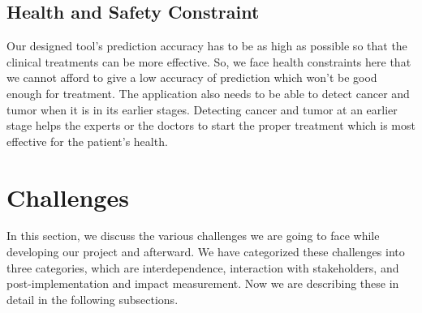 \subsection{Health and Safety Constraint}
Our designed tool’s prediction accuracy has to be as high as possible so that the clinical treatments can be more effective. So, we face health constraints here that we cannot afford to give a low accuracy of prediction which won’t be good enough for treatment. The application also needs to be able to detect cancer and tumor when it is in its earlier stages. Detecting cancer and tumor at an earlier stage helps the experts or the doctors to start the proper treatment which is most effective for the patient’s health.

\section{Challenges}
\label{Chal}
In this section, we discuss the various challenges we are going to face while developing our
project and afterward. We have categorized these challenges into three categories, which are
interdependence, interaction with stakeholders, and post-implementation and impact measurement. Now we are describing these in detail in the following subsections.

